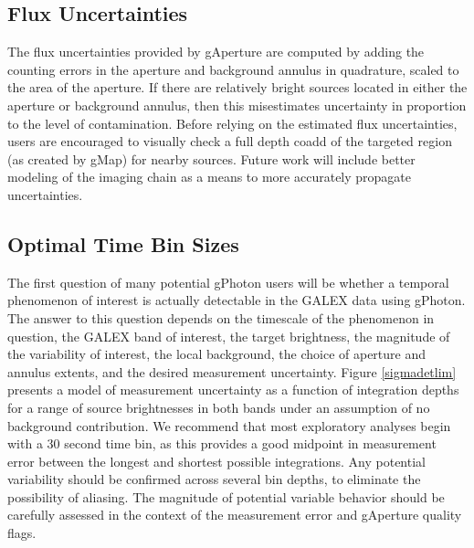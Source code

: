 \documentclass[trackchanges,preprint2]{aastex}
\begin{document}

\subsection{Flux Uncertainties}
\label{fluxuncert}
The flux uncertainties provided by gAperture are computed by adding the counting errors in the aperture and background annulus in quadrature, scaled to the area of the aperture. If there are relatively bright sources located in either the aperture or background annulus, then this misestimates uncertainty in proportion to the level of contamination. Before relying on the estimated flux uncertainties, users are encouraged to visually check a full depth coadd of the targeted region (as created by gMap) for nearby sources. Future work will include better modeling of the imaging chain as a means to more accurately propagate uncertainties.

\subsection{Optimal Time Bin Sizes}
\label{optbinsize}
The first question of many potential gPhoton users will be whether a temporal phenomenon of interest is actually detectable in the GALEX data using gPhoton. The answer to this question depends on the timescale of the phenomenon in question, the GALEX band of interest, the target brightness, the magnitude of the variability of interest, the local background, the choice of aperture and annulus extents, and the desired measurement uncertainty. Figure \ref{sigmadetlim} presents a model of measurement uncertainty as a function of integration depths for a range of source brightnesses in both bands under an assumption of no background contribution. We recommend that most exploratory analyses begin with a 30 second time bin, as this provides a good midpoint in measurement error between the longest and shortest possible integrations. Any potential variability should be confirmed across several bin depths, to eliminate the possibility of aliasing. The magnitude of potential variable behavior should be carefully assessed in the context of the measurement error and gAperture quality flags.
\end{document}
